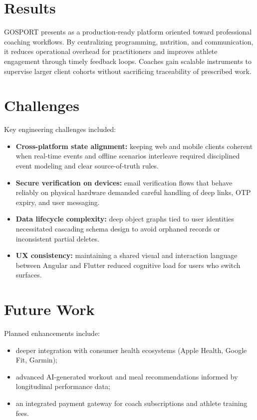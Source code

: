 \documentclass[11pt,a4paper]{report}
\begin{document}
\chapter{Results}

GOSPORT presents as a production-ready platform oriented toward professional coaching workflows. By centralizing programming, nutrition, and communication, it reduces operational overhead for practitioners and improves athlete engagement through timely feedback loops. Coaches gain scalable instruments to supervise larger client cohorts without sacrificing traceability of prescribed work.

\chapter{Challenges}

Key engineering challenges included:
\begin{itemize}[leftmargin=*]
  \item \textbf{Cross-platform state alignment:} keeping web and mobile clients coherent when real-time events and offline scenarios interleave required disciplined event modeling and clear source-of-truth rules.
  \item \textbf{Secure verification on devices:} email verification flows that behave reliably on physical hardware demanded careful handling of deep links, OTP expiry, and user messaging.
  \item \textbf{Data lifecycle complexity:} deep object graphs tied to user identities necessitated cascading schema design to avoid orphaned records or inconsistent partial deletes.
  \item \textbf{UX consistency:} maintaining a shared visual and interaction language between Angular and Flutter reduced cognitive load for users who switch surfaces.
\end{itemize}

\chapter{Future Work}

Planned enhancements include:
\begin{itemize}[leftmargin=*]
  \item deeper integration with consumer health ecosystems (Apple Health, Google Fit, Garmin);
  \item advanced AI-generated workout and meal recommendations informed by longitudinal performance data;
  \item an integrated payment gateway for coach subscriptions and athlete training fees.
\end{itemize}
\end{document}
